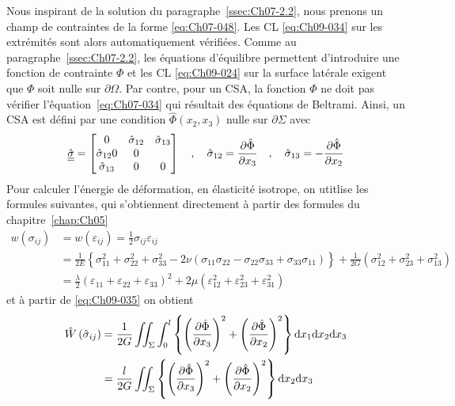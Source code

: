 Nous inspirant de la solution du paragraphe~\ref{ssec:Ch07-2.2}, nous prenons un champ de contraintes de la forme \eqref{eq:Ch07-048}.
Les CL \eqref{eq:Ch09-034} sur les extrémités sont alors automatiquement vérifiées.
Comme au paragraphe~\ref{ssec:Ch07-2.2}, les équations d'équilibre permettent d'introduire une fonction de contrainte $\Phi$ et les CL \eqref{eq:Ch09-024} sur la surface latérale exigent que $\Phi$ soit nulle sur $\partial \Omega$.
Par contre, pour un CSA, la fonction $\Phi$ ne doit pas vérifier l'êquation~\eqref{eq:Ch07-034} qui résultait des équations de Beltrami.
Ainsi, un CSA est défini par une condition $\hat{\Phi} (x_2, x_3)$ nulle sur $\partial \Sigma$ avec
\begin{equation}
    \hat{\underline{\underline{\sigma}}} = 
    \begin{bmatrix}
        0 & \hat{\sigma}_{12} & \hat{\sigma}_{13} \\
        \hat{\sigma}_{12} 0 & 0 \\
        \hat{\sigma}_{13} & 0 & 0
    \end{bmatrix}
    \quad , \quad \hat{\sigma}_{12} = \frac{\partial \hat{\Phi}}{\partial x_3} \quad,\quad \hat{\sigma}_{13} = - \frac{\partial \hat{\Phi}}{\partial x_2}
    \label{eq:Ch09-035}
\end{equation}
Pour calculer l'énergie de déformation, en élasticité isotrope, on utitlise les formules suivantes, qui s'obtiennent directement à partir des formules du chapitre~\ref{chap:Ch05}
\begin{align}
    w(\sigma_{ij}) &= w (\varepsilon_{ij}) = \frac{1}{2} \sigma_{ij} \varepsilon_{ij} \\
    &= \frac{1}{2E} \left\{ \sigma_{11}^2 + \sigma_{22}^2 + \sigma_{33}^2 - 2 \nu \left( \sigma_{11} \sigma_{22} - \sigma_{22} \sigma_{33} + \sigma_{33}\sigma_{11} \right) \right\} + \frac{1}{2G} \left( \sigma_{12}^2 + \sigma_{23}^2 + \sigma_{13}^2 \right) \\
    &= \frac{\lambda}{2} \left( \varepsilon_{11} + \varepsilon_{22} + \varepsilon_{33} \right)^2 + 2\mu \left( \varepsilon_{12}^2 + \varepsilon_{23}^2 + \varepsilon_{31}^2 \right)
    \label{eq:Ch09-036}
\end{align}
et à partir de \eqref{eq:Ch09-035} on obtient 
\begin{align}
    \hat{W}\left( \hat{\sigma}_{ij} \right) &= \frac{1}{2G} \iint_{\Sigma} \int_0^l \left\{ \left( \frac{\partial \hat{\Phi}}{\partial x_3} \right)^2 + \left( \frac{\partial \hat{\Phi}}{\partial x_2} \right)^2 \right\} \mathrm{d} x_1 \mathrm{d} x_2 \mathrm{d} x_3 \\
    &= \frac{l}{2G} \iint_{\Sigma} \left\{ \left( \frac{\partial \hat{\Phi}}{\partial x_3} \right)^2 + \left( \frac{\partial \hat{\Phi}}{\partial x_2} \right)^2 \right\} \mathrm{d} x_2 \mathrm{d} x_3
    \label{eq:Ch09-037}
\end{align}
